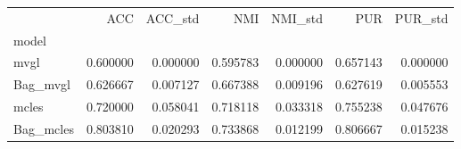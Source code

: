\begin{tabular}{lrrrrrr}
\toprule
 & ACC & ACC_std & NMI & NMI_std & PUR & PUR_std \\
model &  &  &  &  &  &  \\
\midrule
mvgl & 0.600000 & 0.000000 & 0.595783 & 0.000000 & 0.657143 & 0.000000 \\
Bag_mvgl & 0.626667 & 0.007127 & 0.667388 & 0.009196 & 0.627619 & 0.005553 \\
mcles & 0.720000 & 0.058041 & 0.718118 & 0.033318 & 0.755238 & 0.047676 \\
Bag_mcles & 0.803810 & 0.020293 & 0.733868 & 0.012199 & 0.806667 & 0.015238 \\
\bottomrule
\end{tabular}
